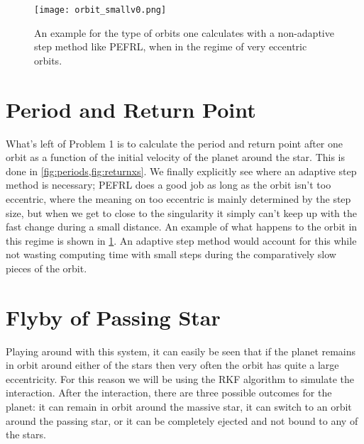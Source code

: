 \documentclass[10pt,a4paper,twocolumn]{article}
\begin{document}
\begin{figure}[t]
    \centering
    \texttt{[image: orbit\_smallv0.png]}
    \caption{An example for the type of orbits one calculates with a non-adaptive step method like PEFRL, when in the regime of very eccentric orbits.}
    \label{fig:orbit_smallv0}
\end{figure}


\section{Period and Return Point}

What's left of Problem 1 is to calculate the period and return point after one orbit as a function of the initial velocity of the planet around the star. This is done in \cref{fig:periods,fig:returnxs}. We finally explicitly see where an adaptive step method is necessary; PEFRL does a good job as long as the orbit isn't too eccentric, where the meaning on too eccentric is mainly determined by the step size, but when we get to close to the singularity it simply can't keep up with the fast change during a small distance. An example of what happens to the orbit in this regime is shown in \cref{fig:orbit_smallv0}. An adaptive step method would account for this while not wasting computing time with small steps during the comparatively slow pieces of the orbit.


\section{Flyby of Passing Star}

Playing around with this system, it can easily be seen that if the planet remains in orbit around either of the stars then very often the orbit has quite a large eccentricity. For this reason we will be using the RKF algorithm to simulate the interaction. After the interaction, there are three possible outcomes for the planet: it can remain in orbit around the massive star, it can switch to an orbit around the passing star, or it can be completely ejected and not bound to any of the stars.
\end{document}
